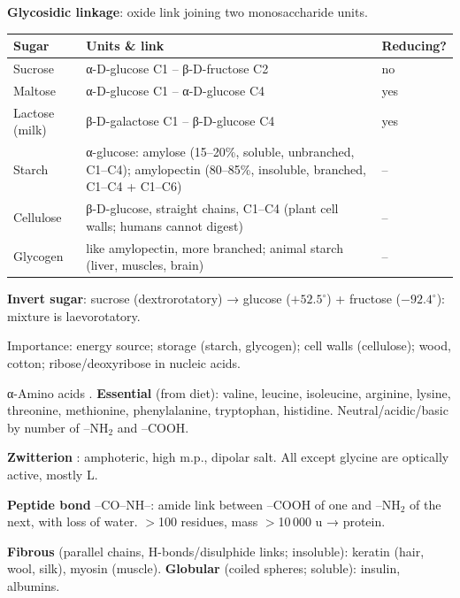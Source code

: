 \documentclass[9pt,a4paper]{extarticle}
\begin{document}
\begin{multicols}{2}
\begin{fl}
\item \textbf{Glycosidic linkage}: oxide link joining two monosaccharide units.
\end{fl}
{\scriptsize\setlength{\tabcolsep}{2pt}
\begin{tabularx}{\linewidth}{@{}l Y l@{}}
\toprule
\textbf{Sugar} & \textbf{Units \& link} & \textbf{Reducing?}\\
\midrule
Sucrose & α-D-glucose C1 -- β-D-fructose C2 & no\\
Maltose & α-D-glucose C1 -- α-D-glucose C4 & yes\\
Lactose (milk) & β-D-galactose C1 -- β-D-glucose C4 & yes\\
Starch & α-glucose: amylose (15--20\%, soluble, unbranched, C1--C4); amylopectin (80--85\%, insoluble, branched, C1--C4 + C1--C6) & --\\
Cellulose & β-D-glucose, straight chains, C1--C4 (plant cell walls; humans cannot digest) & --\\
Glycogen & like amylopectin, more branched; animal starch (liver, muscles, brain) & --\\
\bottomrule
\end{tabularx}\par}
\begin{fl}
\item \textbf{Invert sugar}: sucrose (dextrorotatory) → glucose ($+52.5^\circ$) + fructose ($-92.4^\circ$): mixture is laevorotatory.
\item Importance: energy source; storage (starch, glycogen); cell walls (cellulose); wood, cotton; ribose/deoxyribose in nucleic acids.
\end{fl}
\begin{fl}
\item α-Amino acids . \textbf{Essential} (from diet): valine, leucine, isoleucine, arginine, lysine, threonine, methionine, phenylalanine, tryptophan, histidine. Neutral/acidic/basic by number of --NH$_2$ and --COOH.
\item \textbf{Zwitterion} : amphoteric, high m.p., dipolar salt. All except glycine are optically active, mostly L.
\item \textbf{Peptide bond} --CO--NH--: amide link between --COOH of one and --NH$_2$ of the next, with loss of water. $>$100 residues, mass $>$10\,000 u → protein.
\item \textbf{Fibrous} (parallel chains, H-bonds/disulphide links; insoluble): keratin (hair, wool, silk), myosin (muscle). \textbf{Globular} (coiled spheres; soluble): insulin, albumins.

\end{fl}
\end{multicols}
\end{document}
